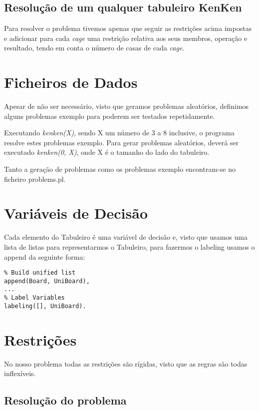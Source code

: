 \documentclass[runningheads,a4paper]{llncs}
\begin{document}
\subsection{Resolução de um qualquer tabuleiro KenKen}
Para resolver o problema tivemos apenas que seguir as restrições acima impostas e adicionar para cada \textit{cage} uma restrição relativa aos seus membros, operação e resultado, tendo em conta o número de casas de cada \textit{cage}.

\section{Ficheiros de Dados}

Apesar de não ser necessário, visto que geramos problemas aleatórios, definimos alguns problemas exemplo para poderem ser testados repetidamente.

Executando \textit{kenken(X)}, sendo X um número de 3 a 8 inclusive, o programa resolve estes problemas exemplo. Para gerar problemas aleatórios, deverá ser executado \textit{kenken(0, X)}, onde X é o tamanho do lado do tabuleiro.


Tanto a geração de problemas como os problemas exemplo encontram-se no ficheiro problems.pl.

\section{Variáveis de Decisão}

Cada elemento do Tabuleiro é uma variável de decisão e, visto que usamos uma lista de listas para representarmos o Tabuleiro, para fazermos o labeling usamos o append da seguinte forma:

\begin{lstlisting}
% Build unified list
append(Board, UniBoard),
...
% Label Variables
labeling([], UniBoard).
\end{lstlisting}

\section{Restrições}

No nosso problema todas as restrições são rígidas, visto que as regras são todas inflexíveis.

\subsection{Resolução do problema}
\end{document}
